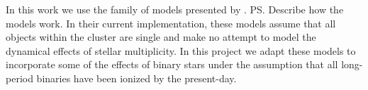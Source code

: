In this work we use the  family of models presented by \citet{Gieles2015}. \ps{Describe
	how the models work}. In their current implementation, these models assume that all objects
within the cluster are single and make no attempt to model the dynamical effects of stellar
multiplicity. In this project we adapt these models to incorporate some of the effects of
binary stars under the assumption that all long-period binaries have been ionized by the
present-day.